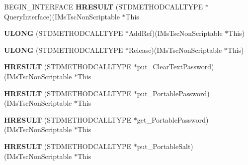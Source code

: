 \begin{DoxyCompactItemize}
\item 
\mbox{\label{struct_i_ms_tsc_non_scriptable_vtbl_aec8058439aefc7e875746bccc7cca089}} 
B\+E\+G\+I\+N\+\_\+\+I\+N\+T\+E\+R\+F\+A\+CE {\bfseries H\+R\+E\+S\+U\+LT} (S\+T\+D\+M\+E\+T\+H\+O\+D\+C\+A\+L\+L\+T\+Y\+PE $\ast$Query\+Interface)(I\+Ms\+Tsc\+Non\+Scriptable $\ast$This
\item 
\mbox{\label{struct_i_ms_tsc_non_scriptable_vtbl_a1c0485d0a4512a60be6781daf9cc7566}} 
{\bfseries U\+L\+O\+NG} (S\+T\+D\+M\+E\+T\+H\+O\+D\+C\+A\+L\+L\+T\+Y\+PE $\ast$Add\+Ref)(I\+Ms\+Tsc\+Non\+Scriptable $\ast$This)
\item 
\mbox{\label{struct_i_ms_tsc_non_scriptable_vtbl_a87bbfc7c19e16f02f34f3f520a49d3fa}} 
{\bfseries U\+L\+O\+NG} (S\+T\+D\+M\+E\+T\+H\+O\+D\+C\+A\+L\+L\+T\+Y\+PE $\ast$Release)(I\+Ms\+Tsc\+Non\+Scriptable $\ast$This)
\item 
\mbox{\label{struct_i_ms_tsc_non_scriptable_vtbl_a82b5de90547c6bd999bd6b828e4ecb36}} 
{\bfseries H\+R\+E\+S\+U\+LT} (S\+T\+D\+M\+E\+T\+H\+O\+D\+C\+A\+L\+L\+T\+Y\+PE $\ast$put\+\_\+\+Clear\+Text\+Password)(I\+Ms\+Tsc\+Non\+Scriptable $\ast$This
\item 
\mbox{\label{struct_i_ms_tsc_non_scriptable_vtbl_a139522cf72d2d49ebeaf18d2bc1e4c91}} 
{\bfseries H\+R\+E\+S\+U\+LT} (S\+T\+D\+M\+E\+T\+H\+O\+D\+C\+A\+L\+L\+T\+Y\+PE $\ast$put\+\_\+\+Portable\+Password)(I\+Ms\+Tsc\+Non\+Scriptable $\ast$This
\item 
\mbox{\label{struct_i_ms_tsc_non_scriptable_vtbl_a8b40d506dc2a4812ba740089e0686ddf}} 
{\bfseries H\+R\+E\+S\+U\+LT} (S\+T\+D\+M\+E\+T\+H\+O\+D\+C\+A\+L\+L\+T\+Y\+PE $\ast$get\+\_\+\+Portable\+Password)(I\+Ms\+Tsc\+Non\+Scriptable $\ast$This
\item 
\mbox{\label{struct_i_ms_tsc_non_scriptable_vtbl_a97979cc0cbd5dd9ca593fb0fd8d4912e}} 
{\bfseries H\+R\+E\+S\+U\+LT} (S\+T\+D\+M\+E\+T\+H\+O\+D\+C\+A\+L\+L\+T\+Y\+PE $\ast$put\+\_\+\+Portable\+Salt)(I\+Ms\+Tsc\+Non\+Scriptable $\ast$This
\item 

\end{DoxyCompactItemize}
